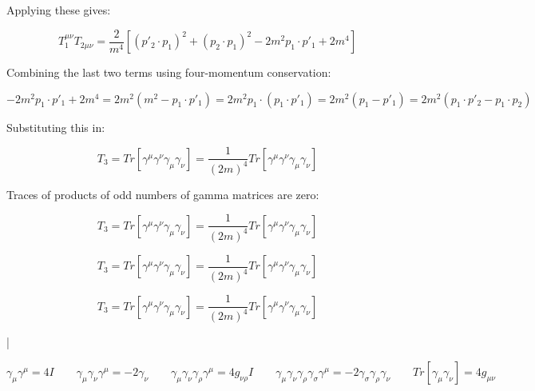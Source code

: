 \documentclass[a4]{article}
\begin{document}
    Applying these gives:

    \begin{equation}
        T_1^{\mu \nu} T_{2 \mu \nu} = \frac{2}{m^4} [(p'_2 \cdot p_1)^2 + (p_2 \cdot p_1)^2 - 2 m^2 p_1 \cdot p'_1 + 2m^4]
    \end{equation}

    Combining the last two terms using four-momentum conservation:
    
    \begin{equation}
        -2 m^2 p_1 \cdot p'_1 + 2 m^4 = 2 m^2 (m^2 - p_1 \cdot p'_1) = 2 m^2 p_1 \cdot (p_1 \cdot p'_1) = 2 m^2 (p_1 - p'_1) = 2 m^2 (p_1 \cdot p'_2 - p_1 \cdot p_2)
    \end{equation}

    Substituting this in:

    \begin{equation}
        T_3 = Tr [\gamma^\mu \gamma^\nu \gamma_\mu \gamma_\nu] = \frac{1}{(2 m)^4} Tr [\gamma^\mu \gamma^\nu \gamma_\mu \gamma_\nu]
    \end{equation}

    Traces of products of odd numbers of gamma matrices are zero:

    \begin{equation}
        T_3 = Tr [\gamma^\mu \gamma^\nu \gamma_\mu \gamma_\nu] = \frac{1}{(2 m)^4} Tr [\gamma^\mu \gamma^\nu \gamma_\mu \gamma_\nu]
    \end{equation}

    \begin{equation}
        T_3 = Tr [\gamma^\mu \gamma^\nu \gamma_\mu \gamma_\nu] = \frac{1}{(2 m)^4} Tr [\gamma^\mu \gamma^\nu \gamma_\mu \gamma_\nu]
    \end{equation}

    \begin{equation}
        T_3 = Tr [\gamma^\mu \gamma^\nu \gamma_\mu \gamma_\nu] = \frac{1}{(2 m)^4} Tr [\gamma^\mu \gamma^\nu \gamma_\mu \gamma_\nu]
    \end{equation}

    \begin{framed}
        |
    \end{framed}

    \begin{equation}
        \gamma_\mu \gamma^\mu = 4 I \qquad \gamma_\mu \gamma_\nu \gamma^\mu = - 2 \gamma_\nu \qquad \gamma_\mu \gamma_\nu \gamma_\rho \gamma^\mu = 4 g_{\nu \rho} I \qquad \gamma_\mu \gamma_\nu \gamma_\rho \gamma_\sigma \gamma^\mu = - 2 \gamma_\sigma \gamma_\rho \gamma_\nu \qquad Tr [\gamma_\mu \gamma_\nu] = 4 g_{\mu \nu}
    \end{equation}
\end{document}
